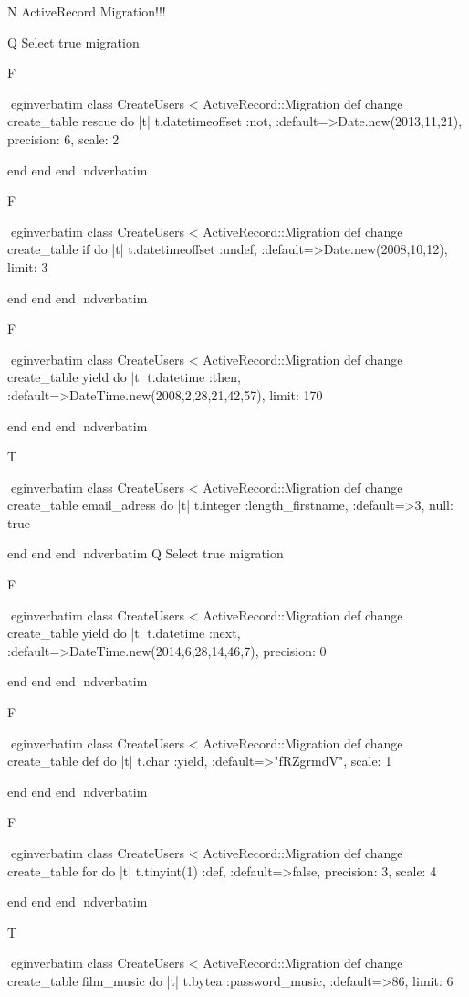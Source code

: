 N
 ActiveRecord Migration!!!
  
Q
 Select true migration

F

egin{verbatim}
 class CreateUsers < ActiveRecord::Migration 
  def change 
    create_table rescue do |t| 
      t.datetimeoffset :not, :default=>Date.new(2013,11,21), precision: 6, scale: 2
    
    end 
  end 
end
nd{verbatim}

F

egin{verbatim}
 class CreateUsers < ActiveRecord::Migration 
  def change 
    create_table if do |t| 
      t.datetimeoffset :undef, :default=>Date.new(2008,10,12), limit: 3
    
    end 
  end 
end
nd{verbatim}

F

egin{verbatim}
 class CreateUsers < ActiveRecord::Migration 
  def change 
    create_table yield do |t| 
      t.datetime :then, :default=>DateTime.new(2008,2,28,21,42,57), limit: 170
    
    end 
  end 
end
nd{verbatim}

T

egin{verbatim}
 class CreateUsers < ActiveRecord::Migration 
  def change 
    create_table email_adress do |t| 
      t.integer :length_firstname, :default=>3, null: true
    
    end 
  end 
end
nd{verbatim}
Q
 Select true migration

F

egin{verbatim}
 class CreateUsers < ActiveRecord::Migration 
  def change 
    create_table yield do |t| 
      t.datetime :next, :default=>DateTime.new(2014,6,28,14,46,7), precision: 0
    
    end 
  end 
end
nd{verbatim}

F

egin{verbatim}
 class CreateUsers < ActiveRecord::Migration 
  def change 
    create_table def do |t| 
      t.char :yield, :default=>"fRZgrmdV", scale: 1
    
    end 
  end 
end
nd{verbatim}

F

egin{verbatim}
 class CreateUsers < ActiveRecord::Migration 
  def change 
    create_table for do |t| 
      t.tinyint(1) :def, :default=>false, precision: 3, scale: 4
    
    end 
  end 
end
nd{verbatim}

T

egin{verbatim}
 class CreateUsers < ActiveRecord::Migration 
  def change 
    create_table film_music do |t| 
      t.bytea :password_music, :default=>86, limit: 6
    
